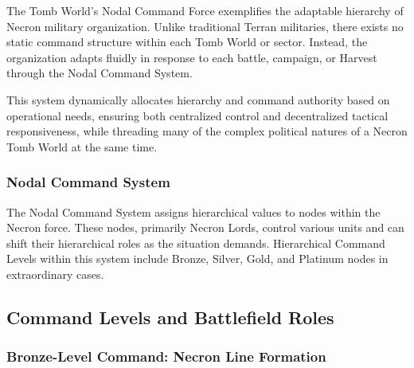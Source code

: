 The Tomb World's Nodal Command Force exemplifies the adaptable hierarchy of Necron military organization. Unlike traditional Terran militaries, there exists no static command structure within each Tomb World or sector. Instead, the organization adapts fluidly in response to each battle, campaign, or Harvest through the Nodal Command System. 

This system dynamically allocates hierarchy and command authority based on operational needs, ensuring both centralized control and decentralized tactical responsiveness, while threading many of the complex political natures of a Necron Tomb World at the same time.


\subsubsection{Nodal Command System}

The Nodal Command System assigns hierarchical values to nodes within the Necron force. These nodes, primarily Necron Lords, control various units and can shift their hierarchical roles as the situation demands. Hierarchical Command Levels within this system include Bronze, Silver, Gold, and Platinum nodes in extraordinary cases.


\subsection{Command Levels and Battlefield Roles}

\subsubsection{Bronze-Level Command: Necron Line Formation}


